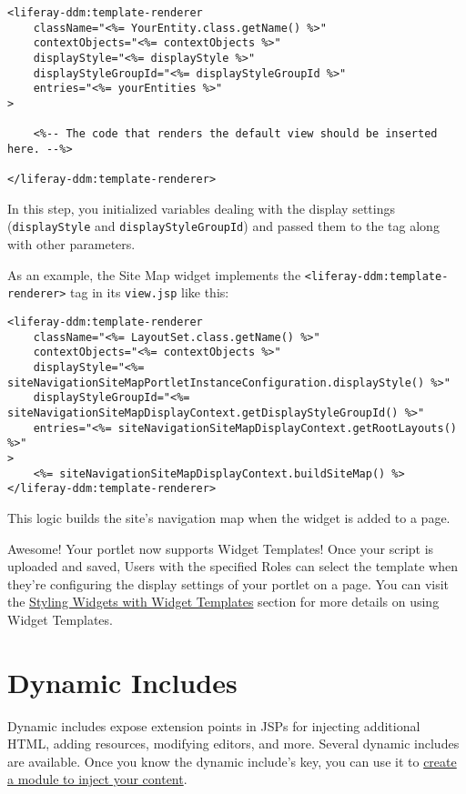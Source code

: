 \begin{enumerate}
\begin{verbatim}
<liferay-ddm:template-renderer
    className="<%= YourEntity.class.getName() %>"
    contextObjects="<%= contextObjects %>"
    displayStyle="<%= displayStyle %>"
    displayStyleGroupId="<%= displayStyleGroupId %>"
    entries="<%= yourEntities %>"
>

    <%-- The code that renders the default view should be inserted here. --%>

</liferay-ddm:template-renderer>
\end{verbatim}

  In this step, you initialized variables dealing with the display
  settings (\texttt{displayStyle} and \texttt{displayStyleGroupId}) and
  passed them to the tag along with other parameters.

  As an example, the Site Map widget implements the
  \texttt{\textless{}liferay-ddm:template-renderer\textgreater{}} tag in
  its \texttt{view.jsp} like this:

\begin{verbatim}
<liferay-ddm:template-renderer
    className="<%= LayoutSet.class.getName() %>"
    contextObjects="<%= contextObjects %>"
    displayStyle="<%= siteNavigationSiteMapPortletInstanceConfiguration.displayStyle() %>"
    displayStyleGroupId="<%= siteNavigationSiteMapDisplayContext.getDisplayStyleGroupId() %>"
    entries="<%= siteNavigationSiteMapDisplayContext.getRootLayouts() %>"
>
    <%= siteNavigationSiteMapDisplayContext.buildSiteMap() %>
</liferay-ddm:template-renderer>
\end{verbatim}

  This logic builds the site's navigation map when the widget is added
  to a page.
\end{enumerate}

Awesome! Your portlet now supports Widget Templates! Once your script is
uploaded and saved, Users with the specified Roles can select the
template when they're configuring the display settings of your portlet
on a page. You can visit the
\href{/docs/7-2/user/-/knowledge_base/u/styling-widgets-with-widget-templates}{Styling
Widgets with Widget Templates} section for more details on using Widget
Templates.

\chapter{Dynamic Includes}\label{dynamic-includes}

Dynamic includes expose extension points in JSPs for injecting
additional HTML, adding resources, modifying editors, and more. Several
dynamic includes are available. Once you know the dynamic include's key,
you can use it to
\href{/docs/7-2/customization/-/knowledge_base/c/customizing-jsps-with-dynamic-includes}{create
a module to inject your content}.

